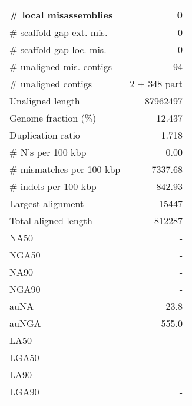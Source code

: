 \documentclass[12pt,a4paper]{article}
\begin{document}
\begin{table}[ht]
\begin{center}
\begin{tabular}{|l*{1}{|r}|}
\# local misassemblies & 0 \\ \hline
\# scaffold gap ext. mis. & 0 \\ \hline
\# scaffold gap loc. mis. & 0 \\ \hline
\# unaligned mis. contigs & 94 \\ \hline
\# unaligned contigs & 2 + 348 part \\ \hline
Unaligned length & 87962497 \\ \hline
Genome fraction (\%) & 12.437 \\ \hline
Duplication ratio & 1.718 \\ \hline
\# N's per 100 kbp & 0.00 \\ \hline
\# mismatches per 100 kbp & 7337.68 \\ \hline
\# indels per 100 kbp & 842.93 \\ \hline
Largest alignment & 15447 \\ \hline
Total aligned length & 812287 \\ \hline
NA50 & - \\ \hline
NGA50 & - \\ \hline
NA90 & - \\ \hline
NGA90 & - \\ \hline
auNA & 23.8 \\ \hline
auNGA & 555.0 \\ \hline
LA50 & - \\ \hline
LGA50 & - \\ \hline
LA90 & - \\ \hline
LGA90 & - \\ \hline
\end{tabular}
\end{center}
\end{table}
\end{document}
